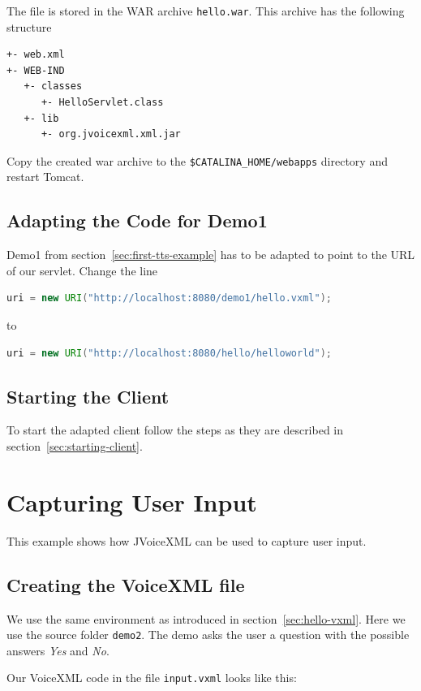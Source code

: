 \documentclass[11pt,a4paper]{book}
\begin{document}
The file is stored in the WAR archive \texttt{hello.war}. This archive has the
following structure
\begin{lstlisting}
+- web.xml
+- WEB-IND
   +- classes
      +- HelloServlet.class
   +- lib
      +- org.jvoicexml.xml.jar
\end{lstlisting}

Copy the created war archive to the \texttt{\$CATALINA\_HOME/webapps}
directory and restart Tomcat.

\subsection{Adapting the Code for Demo1}

Demo1 from section~\ref{sec:first-tts-example} has to be adapted to point to
the URL of our servlet. Change the line
\begin{lstlisting}[language=Java]
uri = new URI("http://localhost:8080/demo1/hello.vxml");
\end{lstlisting}
to
\begin{lstlisting}[language=Java]
uri = new URI("http://localhost:8080/hello/helloworld");
\end{lstlisting}

\subsection{Starting the Client}

To start the adapted client follow the steps as they are described in
section~\ref{sec:starting-client}.

\section{Capturing User Input}

This example shows how JVoiceXML can be used to capture user input. 

\subsection{Creating the VoiceXML file}

We use the same environment as introduced in section~\ref{sec:hello-vxml}. Here
we use the source folder \texttt{demo2}.
The demo asks the user a question with the possible answers
\emph{Yes} and \emph{No}.

Our VoiceXML code in the file \texttt{input.vxml} looks like this:
\end{document}

